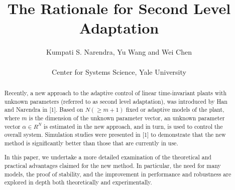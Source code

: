 \documentclass[conference]{IEEEtran}
\begin{document}
\title{The Rationale for Second Level Adaptation}

\pagestyle{fancy}
\author{Kumpati S. Narendra, Yu Wang and Wei Chen\\
\\
{\large Center for Systems Science, Yale University}\\
}













\maketitle

\begin{abstract}
Recently, a new approach to the adaptive control of linear time-invariant plants with unknown parameters (referred to as second level adaptation), was introduced by Han and Narendra in [1]. Based on $N (\geq m+1)$ fixed or adaptive models of the plant, where $m$ is the dimension of the unknown parameter vector, an unknown parameter vector $\alpha\in R^{N}$ is estimated in the new approach, and in turn, is used to control the overall system. Simulation studies were presented in [1] to demonstrate that the new method is significantly better than those that are currently in use.

In this paper, we undertake a more detailed examination of the theoretical and practical advantages claimed for the new method. In particular, the need for many models, the proof of stability, and the improvement in performance and robustness are explored in depth both theoretically and experimentally.
\end{abstract}






\IEEEpeerreviewmaketitle
\end{document}
